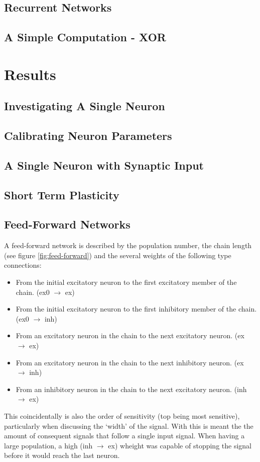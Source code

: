 \documentclass[10pt,a4paper]{article}
\begin{document}
\subsection{Recurrent Networks}

\subsection{A Simple Computation - XOR}

\section{Results}

\subsection{Investigating A Single Neuron}

\subsection{Calibrating Neuron Parameters}

\subsection{A Single Neuron with Synaptic Input}

\subsection{Short Term Plasticity}

\subsection{Feed-Forward Networks}
A feed-forward network is described by the population number, the chain length
(see figure \ref{fig:feed-forward}) and the several weights of the following
type connections:
\begin{itemize}
    \item From the initial excitatory neuron to the first excitatory member of the
        chain. (ex0 $\rightarrow$ ex)
    \item From the initial excitatory neuron to the first inhibitory member of the
        chain. (ex0 $\rightarrow$ inh)
    \item From an excitatory neuron in the chain to the next excitatory neuron.
        (ex $\rightarrow$ ex)
    \item From an excitatory neuron in the chain to the next inhibitory neuron.
        (ex $\rightarrow$ inh)
    \item From an inhibitory neuron in the chain to the next excitatory neuron.
        (inh $\rightarrow$ ex)
\end{itemize}
This coincidentally is also the order of sensitivity (top being most sensitive),
particularly when discussing the `width' of the signal. With this is meant the
the amount of consequent signals that follow a single input signal. When having
a large population, a high (inh $\rightarrow$ ex) wheight was capable of
stopping the signal before it would reach the last neuron.
\end{document}
